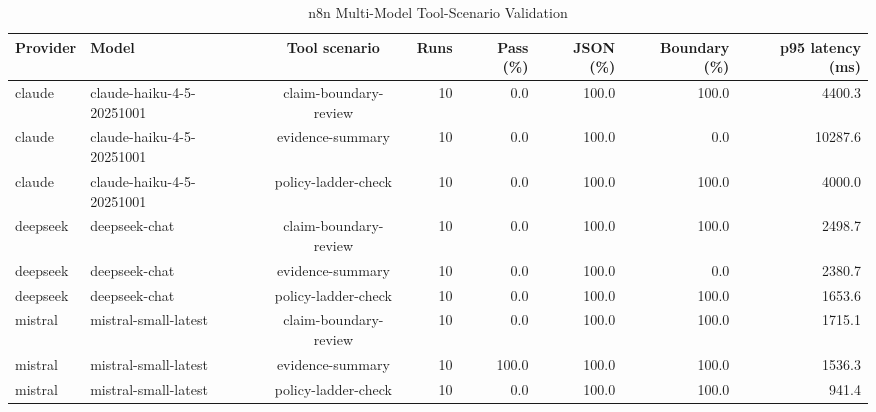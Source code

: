 \begin{table}[!t]
\centering
\caption{n8n Multi-Model Tool-Scenario Validation}
\label{tab:n8n_multimodel_tools}
\begin{adjustbox}{width=\textwidth}
\begin{tabular}{llcrrrrr}
\toprule
Provider & Model & Tool scenario & Runs & Pass (\%) & JSON (\%) & Boundary (\%) & p95 latency (ms) \\
\midrule
claude & claude-haiku-4-5-20251001 & claim-boundary-review & 10 & 0.0 & 100.0 & 100.0 & 4400.3 \\
claude & claude-haiku-4-5-20251001 & evidence-summary & 10 & 0.0 & 100.0 & 0.0 & 10287.6 \\
claude & claude-haiku-4-5-20251001 & policy-ladder-check & 10 & 0.0 & 100.0 & 100.0 & 4000.0 \\
deepseek & deepseek-chat & claim-boundary-review & 10 & 0.0 & 100.0 & 100.0 & 2498.7 \\
deepseek & deepseek-chat & evidence-summary & 10 & 0.0 & 100.0 & 0.0 & 2380.7 \\
deepseek & deepseek-chat & policy-ladder-check & 10 & 0.0 & 100.0 & 100.0 & 1653.6 \\
mistral & mistral-small-latest & claim-boundary-review & 10 & 0.0 & 100.0 & 100.0 & 1715.1 \\
mistral & mistral-small-latest & evidence-summary & 10 & 100.0 & 100.0 & 100.0 & 1536.3 \\
mistral & mistral-small-latest & policy-ladder-check & 10 & 0.0 & 100.0 & 100.0 & 941.4 \\
\bottomrule
\end{tabular}
\end{adjustbox}
\end{table}
